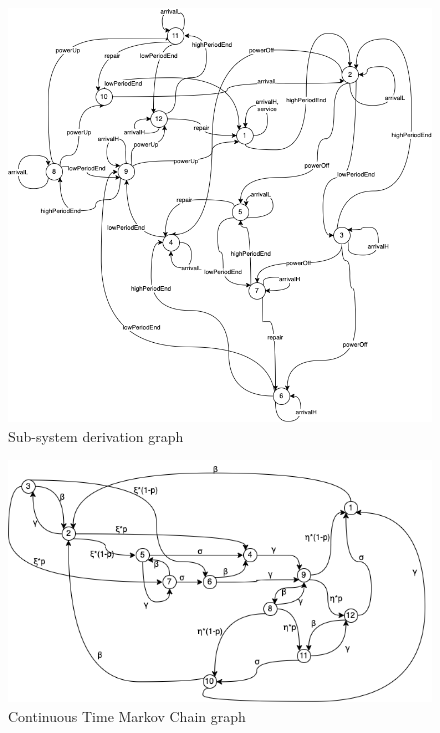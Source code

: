 \documentclass{article}
\begin{document}
\begin{figure}[H]
    \centering
    \includegraphics[width=1.0\textwidth]{sub-system-derivation-graph.png}
    \caption{Sub-system derivation graph}
    \label{fig:sub-system-derivation-graph}
\end{figure}

\begin{figure}[H]
    \centering
    \includegraphics[width=1.0\textwidth]{CTMC-graph.png}
    \caption{Continuous Time Markov Chain graph}
    \label{fig:CTMC-graph}
\end{figure}
 
\end{document}
